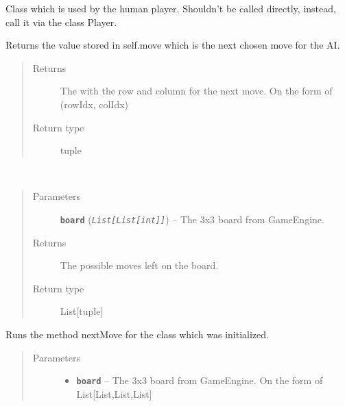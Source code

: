 \documentclass[letterpaper,10pt,english]{sphinxmanual}
\begin{document}
\begin{fulllineitems}
\label{index:Player._User}
Class which is used by the human player. Shouldn't be called directly, instead, call it via the class Player.

\begin{fulllineitems}
\label{index:Player._User.getMove}
Returns the value stored in self.move which is the next chosen move for the AI.
\begin{quote}\begin{description}
\item[{Returns}] \leavevmode
The with the row and column for the next move. On the form of (rowIdx, colIdx)

\item[{Return type}] \leavevmode
tuple

\end{description}\end{quote}

\end{fulllineitems}


\begin{fulllineitems}
\label{index:Player._User.getPossibleMoves}~\begin{quote}\begin{description}
\item[{Parameters}] \leavevmode
\textbf{\texttt{board}} (\emph{\texttt{List{[}List{[}int{]}{]}}}) -- The 3x3 board from GameEngine.

\item[{Returns}] \leavevmode
The possible moves left on the board.

\item[{Return type}] \leavevmode
List{[}tuple{]}

\end{description}\end{quote}

\end{fulllineitems}


\begin{fulllineitems}
\label{index:Player._User.nextMove}
Runs the method nextMove for the class which was initialized.
\begin{quote}\begin{description}
\item[{Parameters}] \leavevmode\begin{itemize}
\item {} 
\textbf{\texttt{board}} -- The 3x3 board from GameEngine. On the form of List{[}List,List,List{]}


\end{itemize}
\end{description}
\end{quote}
\end{fulllineitems}
\end{fulllineitems}
\end{document}
